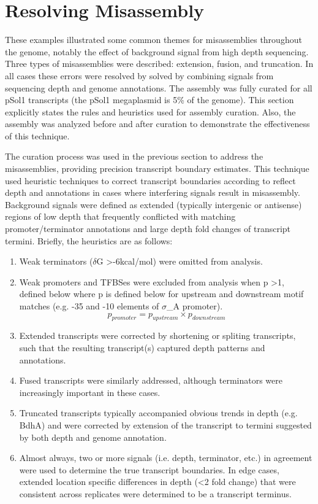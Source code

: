 
\section{Resolving Misassembly}

These examples illustrated some common themes for misassemblies throughout the genome, notably the effect of background signal from high depth sequencing. Three types of misassemblies were described: extension, fusion, and truncation. In all cases these errors were resolved by solved by combining signals from sequencing depth and genome annotations. The assembly was fully curated for all pSol1 transcripts (the pSol1 megaplasmid is 5\% of the genome). This section explicitly states the rules and heuristics used for assembly curation. Also, the assembly was analyzed before and after curation to demonstrate the effectiveness of this technique. 

The curation process was used in the previous section to address the misassemblies, providing precision transcript boundary estimates. This technique used heuristic techniques to correct transcript boundaries according to reflect depth and annotations in cases where interfering signals result in misassembly. Background signals were defined as extended (typically intergenic or antisense) regions of low depth that frequently conflicted with matching promoter/terminator annotations and large depth fold changes of transcript termini. Briefly, the heuristics are as follows:

\begin{enumerate}
\item Weak terminators ($\delta$G \textgreater -6kcal/mol) were omitted from analysis.
\item Weak promoters and TFBSes were excluded from analysis when p \textgreater 1, defined below where p is defined below for upstream and downstream motif matches (e.g. -35 and -10 elements of $\sigma$_{A} promoter). 
\[ p_{promoter} = p_{upstream} \times p_{downstream} \]
\item Extended transcripts were corrected by shortening or spliting transcripts, such that the resulting transcript(s) captured depth patterns and annotations.
\item Fused transcripts were similarly addressed, although terminators were increasingly important in these cases.
\item Truncated transcripts typically accompanied obvious trends in depth (e.g. BdhA) and were corrected by extension of the transcript to termini suggested by both depth and genome annotation.
\item Almost always, two or more signals (i.e. depth, terminator, etc.) in agreement were used to determine the true transcript boundaries. In edge cases, extended location specific differences in depth (\textless 2 fold change) that were consistent across replicates were determined to be a transcript terminus.
\end{enumerate}

